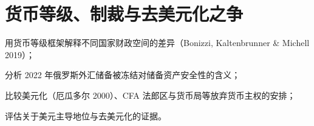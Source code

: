 \chapter{货币等级、制裁与去美元化之争}\label{ch:hierarchy}

\begin{chapterguide}
\begin{guidegoals}
\item 用货币等级框架解释不同国家财政空间的差异（Bonizzi, Kaltenbrunner \& Michell 2019）；
\item 分析 2022 年俄罗斯外汇储备被冻结对储备资产安全性的含义；
\item 比较美元化（厄瓜多尔 2000）、CFA 法郎区与货币局等放弃货币主权的安排；
\item 评估关于美元主导地位与去美元化的证据。
\end{guidegoals}
\end{chapterguide}

\chapterstub

